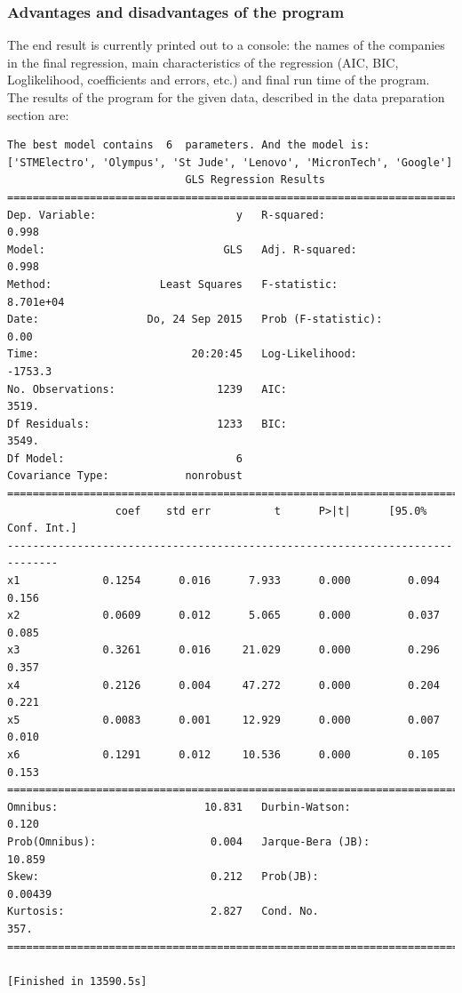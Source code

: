\documentclass{article}
\begin{document}
\subsubsection{Advantages and disadvantages of the program}
The end result is currently printed out to a console: the names of the companies in the final regression, main characteristics of the regression (AIC, BIC, Loglikelihood, coefficients and errors, etc.) and final run time of the program. 
The results of the program for the given data, described in the data preparation section are:
\begin{verbatim}
The best model contains  6  parameters. And the model is:
['STMElectro', 'Olympus', 'St Jude', 'Lenovo', 'MicronTech', 'Google']
                            GLS Regression Results                            
==============================================================================
Dep. Variable:                      y   R-squared:                       0.998
Model:                            GLS   Adj. R-squared:                  0.998
Method:                 Least Squares   F-statistic:                 8.701e+04
Date:                 Do, 24 Sep 2015   Prob (F-statistic):               0.00
Time:                        20:20:45   Log-Likelihood:                -1753.3
No. Observations:                1239   AIC:                             3519.
Df Residuals:                    1233   BIC:                             3549.
Df Model:                           6                                         
Covariance Type:            nonrobust                                         
==============================================================================
                 coef    std err          t      P>|t|      [95.0% Conf. Int.]
------------------------------------------------------------------------------
x1             0.1254      0.016      7.933      0.000         0.094     0.156
x2             0.0609      0.012      5.065      0.000         0.037     0.085
x3             0.3261      0.016     21.029      0.000         0.296     0.357
x4             0.2126      0.004     47.272      0.000         0.204     0.221
x5             0.0083      0.001     12.929      0.000         0.007     0.010
x6             0.1291      0.012     10.536      0.000         0.105     0.153
==============================================================================
Omnibus:                       10.831   Durbin-Watson:                   0.120
Prob(Omnibus):                  0.004   Jarque-Bera (JB):               10.859
Skew:                           0.212   Prob(JB):                      0.00439
Kurtosis:                       2.827   Cond. No.                         357.
==============================================================================

[Finished in 13590.5s]
\end{verbatim}
\end{document}
